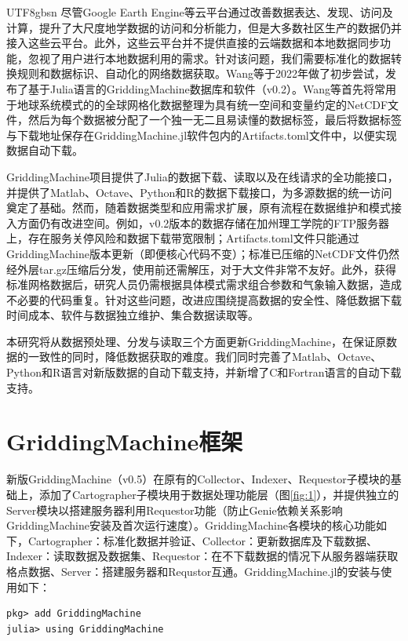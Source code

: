 \documentclass[numdoi]{chinese}
\begin{document}
\begin{CJK}{UTF8}{gbsn}
尽管Google Earth Engine等云平台通过改善数据表达、发现、访问及计算，提升了大尺度地学数据的访问和分析能力\cite{ref4}，但是大多数社区生产的数据仍并接入这些云平台。此外，这些云平台并不提供直接的云端数据和本地数据同步功能，忽视了用户进行本地数据利用的需求。针对该问题，我们需要标准化的数据转换规则和数据标识、自动化的网络数据获取。Wang等\cite{ref5}于2022年做了初步尝试，发布了基于Julia语言的GriddingMachine数据库和软件（v0.2）。Wang等\cite{ref5}首先将常用于地球系统模式的的全球网格化数据整理为具有统一空间和变量约定的NetCDF文件，然后为每个数据被分配了一个独一无二且易读懂的数据标签，最后将数据标签与下载地址保存在GriddingMachine.jl软件包内的Artifacts.toml文件中，以便实现数据自动下载。

GriddingMachine项目提供了Julia的数据下载、读取以及在线请求的全功能接口，并提供了Matlab、Octave、Python和R的数据下载接口，为多源数据的统一访问奠定了基础。然而，随着数据类型和应用需求扩展，原有流程在数据维护和模式接入方面仍有改进空间。例如，v0.2版本的数据存储在加州理工学院的FTP服务器上，存在服务关停风险和数据下载带宽限制；Artifacts.toml文件只能通过GriddingMachine版本更新（即便核心代码不变）；标准已压缩的NetCDF文件仍然经外层tar.gz压缩后分发，使用前还需解压，对于大文件非常不友好。此外，获得标准网格数据后，研究人员仍需根据具体模式需求组合参数和气象输入数据，造成不必要的代码重复。针对这些问题，改进应围绕提高数据的安全性、降低数据下载时间成本、软件与数据独立维护、集合数据读取等。

本研究将从数据预处理、分发与读取三个方面更新GriddingMachine，在保证原数据的一致性的同时，降低数据获取的难度。我们同时完善了Matlab、Octave、Python和R语言对新版数据的自动下载支持，并新增了C和Fortran语言的自动下载支持。




\section{GriddingMachine框架}
新版GriddingMachine（v0.5）在原有的Collector、Indexer、Requestor子模块的基础上，添加了Cartographer子模块用于数据处理功能层（图\ref{fig:1}），并提供独立的Server模块以搭建服务器利用Requestor功能（防止Genie依赖关系影响GriddingMachine安装及首次运行速度）。GriddingMachine各模块的核心功能如下，Cartographer：标准化数据并验证、Collector：更新数据库及下载数据、Indexer：读取数据及数据集、Requestor：在不下载数据的情况下从服务器端获取格点数据、Server：搭建服务器和Requstor互通。GriddingMachine.jl的安装与使用如下：

\begin{Verbatim}[frame=single]
pkg> add GriddingMachine
julia> using GriddingMachine
\end{Verbatim}


\end{CJK}
\end{document}

